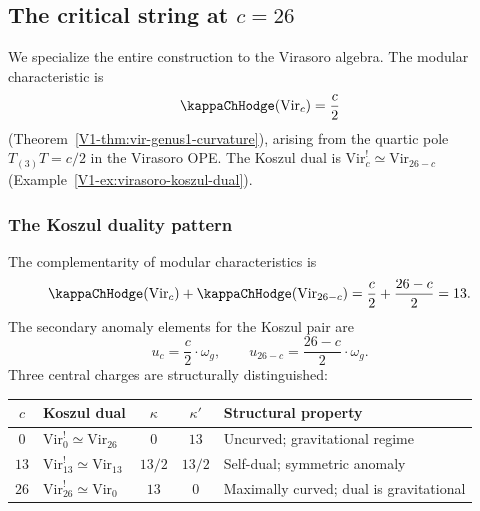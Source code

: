 %
%

\subsection{The critical string at $c = 26$}

We specialize the entire construction to the Virasoro algebra.
The modular characteristic is
\begin{equation}%
\kappaChHodge(\mathrm{Vir}_c) = \frac{c}{2}
\end{equation}
(Theorem~\ref{V1-thm:vir-genus1-curvature}), arising from the quartic
pole $T_{(3)}T = c/2$ in the Virasoro OPE. The Koszul dual is
$\mathrm{Vir}_c^! \simeq \mathrm{Vir}_{26-c}$
(Example~\ref{V1-ex:virasoro-koszul-dual}).

\subsubsection{The Koszul duality pattern}

The complementarity of modular characteristics is
\begin{equation}%
\kappaChHodge(\mathrm{Vir}_c) + \kappaChHodge(\mathrm{Vir}_{26-c})
= \frac{c}{2} + \frac{26-c}{2} = 13.
\end{equation}
The secondary anomaly elements for the Koszul pair are
\begin{equation}%
u_c = \frac{c}{2} \cdot \omega_g,
\qquad
u_{26-c} = \frac{26-c}{2} \cdot \omega_g.
\end{equation}
Three central charges are structurally distinguished:

\begin{center}
\renewcommand{\arraystretch}{1.4}
\begin{tabular}{clccl}
\toprule
$c$ & Koszul dual & $\kappa$ & $\kappa'$ & Structural property \\
\midrule
$0$ & $\mathrm{Vir}_0^! \simeq \mathrm{Vir}_{26}$ & $0$ & $13$ &
 Uncurved; gravitational regime \\
$13$ & $\mathrm{Vir}_{13}^! \simeq \mathrm{Vir}_{13}$ & $13/2$ & $13/2$ &
 Self-dual; symmetric anomaly \\
$26$ & $\mathrm{Vir}_{26}^! \simeq \mathrm{Vir}_0$ & $13$ & $0$ &
 Maximally curved; dual is gravitational \\
\bottomrule
\end{tabular}
\end{center}

